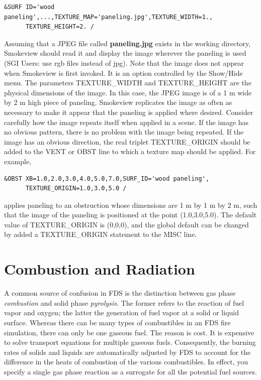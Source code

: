 \documentclass[11pt]{book}
\begin{document}
\footnotesize
\begin{verbatim}
&SURF ID='wood paneling',...,TEXTURE_MAP='paneling.jpg',TEXTURE_WIDTH=1.,
      TEXTURE_HEIGHT=2. /
\end{verbatim}
\normalsize
Assuming that a JPEG file called {\bf paneling.jpg} exists in the
working directory, Smokeview should read it and display the image
wherever the paneling is used (SGI Users: use rgb files instead of jpg).
Note that the image does not appear when Smokeview is first invoked. It is an option controlled by
the {\ct Show/Hide} menu. The parameters {\ct TEXTURE\_WIDTH}
and {\ct TEXTURE\_HEIGHT} are the physical dimensions of the image.
In this case, the JPEG image is of a 1 m wide by 2 m high piece of
paneling. Smokeview replicates the image as often as necessary to
make it appear that the paneling is applied where desired.
Consider carefully how the image repeats itself when
applied in a scene. If the image has no obvious pattern, there is no
problem with the image being repeated. If the image has an obvious
direction, the real triplet {\ct TEXTURE\_ORIGIN} should be added to
the {\ct VENT} or {\ct OBST} line to which a texture map
should be applied. For example,

\footnotesize
\begin{verbatim}
&OBST XB=1.0,2.0,3.0,4.0,5.0,7.0,SURF_ID='wood paneling',
      TEXTURE_ORIGIN=1.0,3.0,5.0 /
\end{verbatim}
\normalsize
applies paneling to an obstruction whose dimensions are 1 m by
1 m by 2 m, such that the image of the paneling is positioned
at the point (1.0,3.0,5.0). The default value of {\ct TEXTURE\_ORIGIN}
is (0,0,0), and the global default can be changed by added a
{\ct TEXTURE\_ORIGIN} statement to the {\ct MISC} line.






\chapter{Combustion and Radiation}
\label{chap:combustion}

A common source of confusion in FDS is the distinction between gas phase {\em combustion} and solid phase {\em pyrolysis}. The former
refers to the reaction of fuel vapor and oxygen; the latter the generation of fuel vapor at a solid or liquid surface. Whereas there
can be many types of combustibles in an FDS fire simulation, there can only be one gaseous fuel. The reason is cost. It is expensive to
solve transport equations for multiple gaseous fuels. Consequently, the burning rates of solids and liquids are automatically adjusted by
FDS to account for the difference in the heats of combustion of the various combustibles. In effect, you specify a single gas phase
reaction as a surrogate for all the potential fuel sources.
\end{document}
